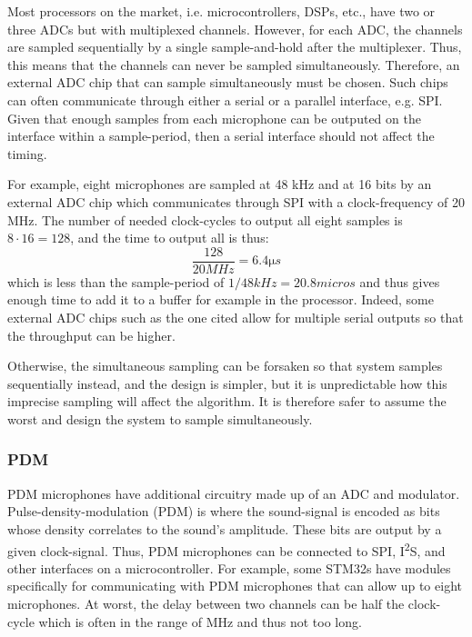 \documentclass[notitlepage]{report}
\begin{document}
Most processors on the market, i.e. microcontrollers, DSPs, etc., have two or three ADCs but with multiplexed channels. However, for each ADC, the channels are sampled sequentially by a single sample-and-hold after the multiplexer. Thus, this means that the channels can never be sampled simultaneously. Therefore, an external ADC chip that can sample simultaneously must be chosen. Such chips can often communicate through either a serial or a parallel interface, e.g. SPI. Given that enough samples from each microphone can be outputed on the interface within a sample-period, then a serial interface should not affect the timing.

For example, eight microphones are sampled at 48 \si{kHz} and at 16 bits by an external ADC chip which communicates through SPI with a clock-frequency of 20 \si{MHz}. The number of needed clock-cycles to output all eight samples is $8\cdot 16 = 128$, and the time to output all is thus:
\begin{equation}
\frac{128}{20 \si{MHz}} = 6.4 \si{\micro s}
\end{equation}
which is less than the sample-period of $1/48 \si{kHz} = 20.8\si{micro s}$ and thus gives enough time to add it to a buffer for example in the processor. Indeed, some external ADC chips such as the one cited allow for multiple serial outputs so that the throughput can be higher.

Otherwise, the simultaneous sampling can be forsaken so that system samples sequentially instead, and the design is simpler, but it is unpredictable how this imprecise sampling will affect the algorithm. It is therefore safer to assume the worst and design the system to sample simultaneously.

\subsubsection{PDM}

PDM microphones have additional circuitry made up of an ADC and modulator. Pulse-density-modulation (PDM) is where the sound-signal is encoded as bits whose density correlates to the sound's amplitude. These bits are output by a given clock-signal. Thus, PDM microphones can be connected to SPI, I\textsuperscript{2}S, and other interfaces on a microcontroller. For example, some STM32s have modules specifically for communicating with PDM microphones that can allow up to eight microphones. At worst, the delay between two channels can be half the clock-cycle which is often in the range of \si{MHz} and thus not too long.
\end{document}
